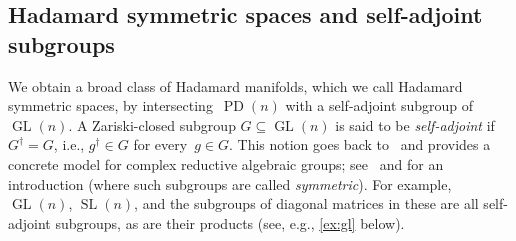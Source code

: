 \documentclass[11pt,letterpaper]{article}
\numberwithin{equation}{section}
\DeclareMathOperator{\PD}{PD}
\DeclareMathOperator{\GL}{GL}
\DeclareMathOperator{\SL}{SL}
\begin{document}
\subsection{Hadamard symmetric spaces and self-adjoint subgroups}\label{sub:selfconjugate}
We obtain a broad class of Hadamard manifolds, which we call Hadamard symmetric spaces, by intersecting~$\PD(n)$ with a self-adjoint subgroup of~$\GL(n)$.
A Zariski-closed subgroup $G \subseteq \GL(n)$ is said to be \emph{self-adjoint} if~$G^\dagger = G$, i.e., $g^\dagger\in G$ for every~$g\in G$.
This notion goes back to~\cite{mostow1955self} and provides a concrete model for complex reductive algebraic groups; see~\cite[\S{}2.2]{Wallach2017} and \cite{BFGOWW2019} for an introduction (where such subgroups are called \emph{symmetric}).
For example, $\GL(n)$, $\SL(n)$, and the subgroups of diagonal matrices in these are all self-adjoint subgroups, as are their products (see, e.g., \cref{ex:gl} below).
\end{document}
